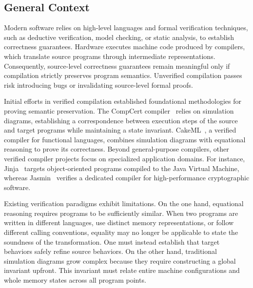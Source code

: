 \documentclass[report.tex]{subfiles}
\begin{document}
\maketitle

\subsection*{General Context}

Modern software relies on high-level languages
and formal verification techniques,
such as deductive verification,
model checking,
or static analysis,
to establish correctness guarantees.
Hardware executes machine code produced by compilers,
which translate source programs through intermediate representations.
Consequently,
source-level correctness guarantees remain meaningful only if compilation
strictly preserves program semantics.
Unverified compilation passes risk introducing bugs
or invalidating source-level formal proofs.

Initial efforts in verified compilation established foundational methodologies
for proving semantic preservation.
The CompCert compiler~\parencite{leroy-09-compcert}
relies on simulation diagrams,
establishing a correspondence between execution steps
of the source and target programs
while maintaining a state invariant.
CakeML~\parencite{tan-19-cakeml},
a verified compiler for functional languages,
combines simulation diagrams with equational reasoning
to prove its correctness.
Beyond general-purpose compilers,
other verified compiler projects focus on specialized application domains.
For instance,
Jinja~\parencite{klein-06-jinja}
targets object-oriented programs compiled to the Java Virtual Machine,
whereas Jasmin~\parencite{almeida-17-jasmin}
verifies a dedicated compiler
for high-performance cryptographic software.

Existing verification paradigms exhibit limitations.
On the one hand,
equational reasoning requires programs to be sufficiently similar.
When two programs are written in different languages,
use distinct memory representations,
or follow different calling conventions,
equality may no longer be applicable
to state the soundness of the transformation.
One must instead establish
that target behaviors safely refine source behaviors.
On the other hand,
traditional simulation diagrams grow complex
because they require constructing a global invariant upfront.
This invariant must relate entire machine configurations
and whole memory states across all program points.
\end{document}
